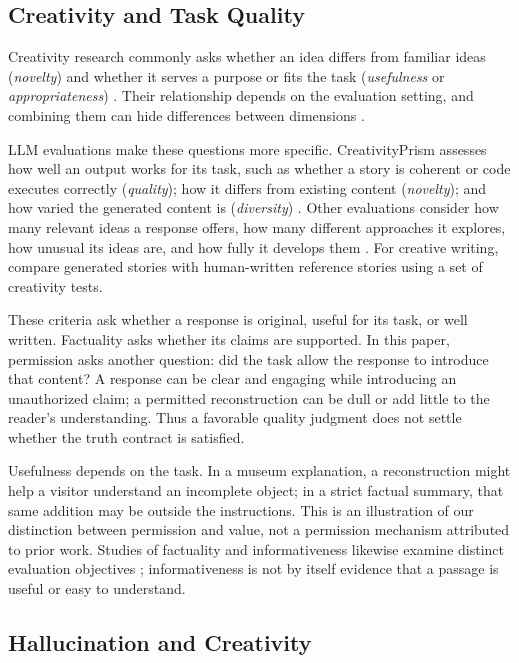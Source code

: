 \documentclass{clv2025}
\begin{document}
\subsection{Creativity and Task Quality}\label{subsec:creativity}

Creativity research commonly asks whether an idea differs from familiar
ideas (\emph{novelty}) and whether it serves a purpose or fits the task
(\emph{usefulness} or \emph{appropriateness})
\citep{runco_standard_2012,diedrich_are_2015}.
Their relationship depends on the evaluation setting, and combining them can
hide differences between dimensions \citep{pichot_reflective_2024}.

LLM evaluations make these questions more specific. CreativityPrism assesses
how well an output works for its task, such as whether a story is coherent
or code executes correctly (\emph{quality}); how it differs from existing
content (\emph{novelty}); and how varied the generated content is
(\emph{diversity}) \citep{hou_creativityprism_2025}.
Other evaluations consider how many relevant ideas a response offers, how
many different approaches it explores, how unusual its ideas are, and how
fully it develops them \citep{zhao_assessing_2025}. For creative writing,
\citet{li_automated_2025} compare generated stories with human-written
reference stories using a set of creativity tests.

These criteria ask whether a response is original, useful for its task,
or well written. Factuality asks whether its claims are supported. In this
paper, permission asks another question: did the task allow the response
to introduce that content? A response can be clear and engaging while
introducing an unauthorized claim; a permitted reconstruction can be dull
or add little to the reader's understanding. Thus a favorable quality
judgment does not settle whether the truth contract is satisfied.

Usefulness depends on the task. In a museum explanation, a reconstruction
might help a visitor understand an incomplete object; in a strict factual
summary, that same addition may be outside the instructions. This is an
illustration of our distinction between permission and value, not a
permission mechanism attributed to prior work. Studies of factuality and
informativeness likewise examine distinct evaluation objectives
\citep{wu_balancing_2025,gong_factuality_2026}; informativeness is not by
itself evidence that a passage is useful or easy to understand.

\subsection{Hallucination and Creativity}
\end{document}
